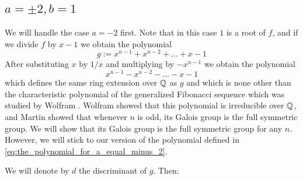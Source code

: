 \documentclass[../main.tex]{subfiles}
\begin{document}
\subsection{$a = \pm 2, b = 1$}

We will handle the case $a = -2$ first.
Note that in this case $1$ is a root of $f$, and if we divide $f$ by $x-1$ we obtain the polynomial 
\begin{equation}
  \label{eq:the_polynomial_for_a_equal_minus_2}
  g := x^{n-1} + x^{n-2} + \ldots + x - 1
\end{equation}
After substituting $x$ by $1/x$ and multiplying by $-x^{n-1}$ we obtain the polynomial 
\[
  x^{n-1} - x^{n-2} - \ldots - x - 1
\]
which defines the same ring extension over $\mathbb{Q}$ as $g$ and which is none other than the characteristic polynomial of the generalized Fibonacci sequence which was studied by Wolfram \cite{Wolfram1998}.
Wolfram showed that this polynomial is irreducible over $\mathbb{Q}$, and Martin \cite{MARTIN2004213} showed that whenever $n$ is odd, its Galois group is the full symmetric group.
We will show that its Galois group is the full symmetric group for any $n$.
However, we will stick to our version of the polynomial defined in \eqref{eq:the_polynomial_for_a_equal_minus_2}.

We will denote by $d$ the discriminant of $g$. 
Then:
\end{document}
